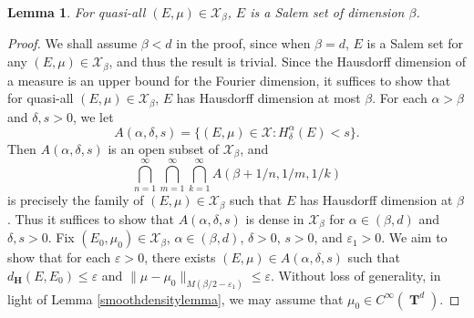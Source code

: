 \documentclass[dvipsnames,letterpaper,12pt]{article}
\numberwithin{equation}{section}
\DeclareMathOperator{\hausdim}{\dim_{\mathbf{H}}}
\DeclareMathOperator{\fordim}{\dim_{\mathbf{F}}}
\DeclareMathOperator{\TT}{\mathbf{T}}
\newtheorem{lemma}[theorem]{Lemma}
\numberwithin{theorem}{section}
\begin{document}
\begin{lemma}
    For quasi-all $(E,\mu) \in \mathcal{X}_\beta$, $E$ is a Salem set of dimension $\beta$.
\end{lemma}
\begin{proof}
    We shall assume $\beta < d$ in the proof, since when $\beta = d$, $E$ is a Salem set for any $(E,\mu) \in \mathcal{X}_\beta$, and thus the result is trivial. Since the Hausdorff dimension of a measure is an upper bound for the Fourier dimension, it suffices to show that for quasi-all $(E,\mu) \in \mathcal{X}_\beta$, $E$ has Hausdorff dimension at most $\beta$. For each $\alpha > \beta$ and $\delta, s > 0$, we let
    \[ A(\alpha,\delta,s) = \{ (E,\mu) \in \mathcal{X}: H^\alpha_\delta(E) < s \}. \]
    Then $A(\alpha,\delta,s)$ is an open subset of $\mathcal{X}_\beta$, and
    \begin{equation}
        \bigcap_{n = 1}^\infty \bigcap_{m = 1}^\infty \bigcap_{k = 1}^\infty A(\beta + 1/n, 1/m, 1/k)
    \end{equation}
    is precisely the family of $(E,\mu) \in \mathcal{X}_\beta$ such that $E$ has Hausdorff dimension at $\beta$.
%
    Thus it suffices to show that $A(\alpha,\delta,s)$ is dense in $\mathcal{X}_\beta$ for $\alpha \in (\beta,d)$ and $\delta, s > 0$. Fix $(E_0,\mu_0) \in \mathcal{X}_\beta$, $\alpha \in (\beta,d)$, $\delta > 0$, $s > 0$, and $\varepsilon_1 > 0$. We aim to show that for each $\varepsilon > 0$, there exists $(E,\mu) \in A(\alpha,\delta,s)$ such that $d_\mathbf{H}(E,E_0) \leq \varepsilon$ and $\| \mu - \mu_0 \|_{M(\beta/2 - \varepsilon_1)} \leq \varepsilon$. Without loss of generality, in light of Lemma \ref{smoothdensitylemma}, we may assume that $\mu_0 \in C^\infty(\TT^d)$.


\end{proof}
\end{document}

